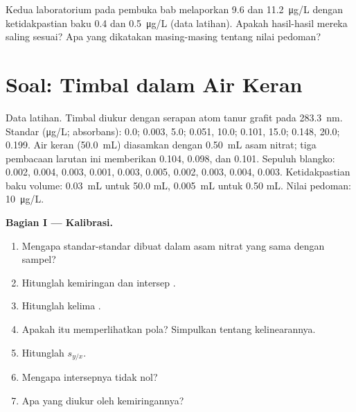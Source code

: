 \begin{exercise}[$\star\star\star$]\label{exo:b2:measurement-statistics:12}
Kedua laboratorium pada pembuka bab melaporkan 9.6 dan \qty{11.2}{\micro g/L}
dengan ketidakpastian baku 0.4 dan \qty{0.5}{\micro g/L} (data latihan).
Apakah hasil-hasil mereka saling sesuai? Apa yang dikatakan masing-masing
tentang nilai pedoman?
\end{exercise}

\section{Soal: Timbal dalam Air Keran}

\begin{problem}
\label{pb:b2:measurement-statistics:1}
Data latihan. Timbal diukur dengan serapan atom tanur grafit pada
\qty{283.3}{nm}. Standar
(\unit{\micro g/L}; absorbans): 0.0; 0.003, 5.0; 0.051, 10.0; 0.101, 15.0;
0.148, 20.0; 0.199. Air keran
(\qty{50.0}{mL}) diasamkan dengan \qty{0.50}{mL} asam nitrat; tiga pembacaan
larutan ini memberikan 0.104, 0.098, dan 0.101. Sepuluh blangko: 0.002,
0.004, 0.003, 0.001, 0.003, 0.005, 0.002,
0.003, 0.004, 0.003. Ketidakpastian baku volume: \qty{0.03}{mL} untuk 50.0 mL,
\qty{0.005}{mL} untuk 0.50 mL. Nilai pedoman: \qty{10}{\micro g/L}.

\medskip
\noindent\textbf{Bagian I --- Kalibrasi.}
\begin{enumerate}
  \item Mengapa standar-standar dibuat dalam asam nitrat yang sama dengan sampel?
  \item Hitunglah kemiringan dan intersep .
  \item Hitunglah kelima .
  \item Apakah  itu memperlihatkan pola? Simpulkan tentang kelinearannya.
  \item Hitunglah $s_{y/x}$.
  \item Mengapa intersepnya tidak nol?
  \item Apa yang diukur oleh kemiringannya?
\end{enumerate}


\end{problem}
